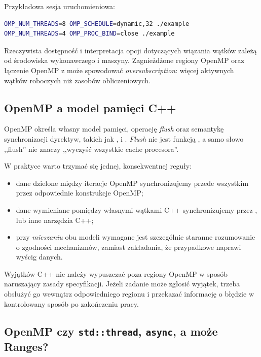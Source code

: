 Przykładowa sesja uruchomieniowa:
\begin{lstlisting}[language=bash,caption={Sterowanie środowiskiem bez zmiany źródeł.}]
OMP_NUM_THREADS=8 OMP_SCHEDULE=dynamic,32 ./example
OMP_NUM_THREADS=4 OMP_PROC_BIND=close ./example
\end{lstlisting}

Rzeczywista dostępność i interpretacja opcji dotyczących wiązania
wątków zależą od środowiska wykonawczego i maszyny. Zagnieżdżone
regiony OpenMP oraz łączenie OpenMP z 
może spowodować \emph{oversubscription}: więcej aktywnych
wątków roboczych niż zasobów obliczeniowych.

\subsection{OpenMP a model pamięci C++}

OpenMP określa własny model pamięci, operację \emph{flush} oraz
semantykę synchronizacji dyrektyw, takich jak ,
 i . \emph{Flush} nie jest funkcją
, a samo słowo ,,flush'' nie znaczy
,,wyczyść wszystkie cache procesora''.

W praktyce warto trzymać się jednej, konsekwentnej reguły:
\begin{itemize}
\item dane dzielone między iteracje OpenMP synchronizujemy przede
wszystkim przez odpowiednie konstrukcje OpenMP;
\item dane wymieniane pomiędzy własnymi wątkami C++ synchronizujemy
przez ,  lub inne narzędzia C++;
\item przy \emph{mieszaniu} obu modeli wymagane jest szczególnie
staranne rozumowanie o zgodności mechanizmów, zamiast zakładania,
że przypadkowe  naprawi wyścig danych.
\end{itemize}

Wyjątków C++ nie należy wypuszczać poza regiony OpenMP w sposób
naruszający zasady specyfikacji. Jeżeli zadanie może zgłosić wyjątek,
trzeba obsłużyć go wewnątrz odpowiedniego regionu i przekazać
informację o błędzie w kontrolowany sposób po zakończeniu pracy.

\subsection{OpenMP czy \texttt{std::thread}, \texttt{async}, a może Ranges?}

